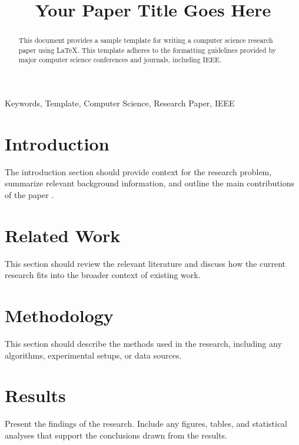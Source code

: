 \documentclass[conference]{IEEEtran}
\begin{document}
\title{Your Paper Title Goes Here}

\author{
}

\maketitle

\begin{abstract}
This document provides a sample template for writing a computer science research paper using \LaTeX. This template adheres to the formatting guidelines provided by major computer science conferences and journals, including IEEE.
\end{abstract}

\begin{IEEEkeywords}
Keywords, Template, Computer Science, Research Paper, IEEE
\end{IEEEkeywords}

\section{Introduction}
The introduction section should provide context for the research problem, summarize relevant background information, and outline the main contributions of the paper \cite{example_ref}.

\section{Related Work}
This section should review the relevant literature and discuss how the current research fits into the broader context of existing work.

\section{Methodology}
This section should describe the methods used in the research, including any algorithms, experimental setups, or data sources.

\section{Results}
Present the findings of the research. Include any figures, tables, and statistical analyses that support the conclusions drawn from the results.
\end{document}
